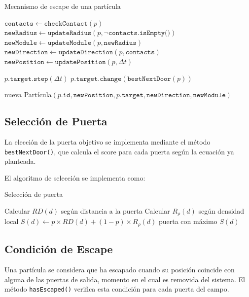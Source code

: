 \documentclass[12pt]{article}
\begin{document}
\begin{algorithm}[H]
\caption{Mecanismo de escape de una partícula}
\begin{algorithmic}[1]
    \State $\texttt{contacts} \leftarrow \texttt{checkContact}(p)$
    \State $\texttt{newRadius} \leftarrow \texttt{updateRadius}(p, \neg \texttt{contacts.isEmpty()})$
    \State $\texttt{newModule} \leftarrow \texttt{updateModule}(p, \texttt{newRadius})$
    \State $\texttt{newDirection} \leftarrow \texttt{updateDirection}(p, \texttt{contacts})$
    \State $\texttt{newPosition} \leftarrow \texttt{updatePosition}(p, \Delta t)$
    
    \State $p.\texttt{target.step}(\Delta t)$
        \State $p.\texttt{target.change}(\texttt{bestNextDoor}(p))$
    \EndIf
    
    \State \Return nueva Partícula$(p.\texttt{id}, \texttt{newPosition}, p.\texttt{target}, \texttt{newDirection}, \texttt{newModule})$
\EndFunction
\end{algorithmic}
\end{algorithm}

\subsection{Selección de Puerta}
La elección de la puerta objetivo se implementa mediante el método \texttt{bestNextDoor()}, que calcula el score para cada puerta según la ecuación ya planteada.

El algoritmo de selección se implementa como:

\begin{algorithm}[H]
\caption{Selección de puerta}
\begin{algorithmic}[1]
    \State Calcular $RD(d)$ según distancia a la puerta
    \State Calcular $R_\rho(d)$ según densidad local
    \State $S(d) \leftarrow p \times RD(d) + (1-p) \times R_\rho(d)$
\EndFor
\State \Return puerta con máximo $S(d)$
\end{algorithmic}
\end{algorithm}

\subsection{Condición de Escape}
Una partícula se considera que ha escapado cuando su posición coincide con alguna de las puertas de salida, momento en el cual es removida del sistema. El método \texttt{hasEscaped()} verifica esta condición para cada puerta del campo.
\end{document}
